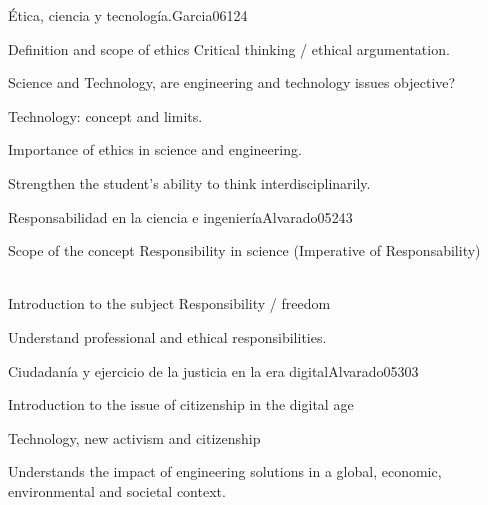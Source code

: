 \begin{syllabus}
\begin{unit}{Ética, ciencia y tecnología.}{}{Garcia06}{12}{4}
   \begin{topics}
      \item Definition and scope of ethics Critical thinking / ethical argumentation.
      \item Science and Technology, are engineering and technology issues objective?
      \item Technology: concept and limits.
      \item Importance of ethics in science and engineering.
   \end{topics}
   \begin{learningoutcomes}
      \item Strengthen the student's ability to think interdisciplinarily.
   \end{learningoutcomes}
\end{unit}


\begin{unit}{Responsabilidad en la ciencia e ingeniería}{}{Alvarado05}{24}{3}
   \begin{topics}
      \item Scope of the concept Responsibility in science (Imperative of Responsability)
      \item Introduction to the subject Responsibility / freedom
   \end{topics}

   \begin{learningoutcomes}
      \item Understand professional and ethical responsibilities.
   \end{learningoutcomes}
\end{unit}

\begin{unit}{ Ciudadanía y ejercicio de la justicia en la era digital}{}{Alvarado05}{30}{3}
   \begin{topics}
      \item Introduction to the issue of citizenship in the digital age
      \item Technology, new activism and citizenship
   \end{topics}

   \begin{learningoutcomes}
      \item  Understands the impact of engineering solutions in a global, economic, environmental and societal context.
   \end{learningoutcomes}
\end{unit}



\begin{coursebibliography}
\end{coursebibliography}

\end{syllabus}
